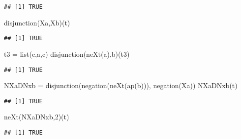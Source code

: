 \documentclass[
]{article}
\newenvironment{Shaded}{\begin{snugshade}}{\end{snugshade}}
\newcommand{\DecValTok}[1]{\textcolor[rgb]{0.00,0.00,0.81}{#1}}
\newcommand{\FunctionTok}[1]{\textcolor[rgb]{0.00,0.00,0.00}{#1}}
\newcommand{\NormalTok}[1]{#1}
\newcommand{\OtherTok}[1]{\textcolor[rgb]{0.56,0.35,0.01}{#1}}
\newcommand{\StringTok}[1]{\textcolor[rgb]{0.31,0.60,0.02}{#1}}
\begin{document}
\begin{verbatim}
## [1] TRUE
\end{verbatim}

\begin{Shaded}
\begin{Highlighting}[]
\FunctionTok{disjunction}\NormalTok{(Xa,Xb)(t) }
\end{Highlighting}
\end{Shaded}

\begin{verbatim}
## [1] TRUE
\end{verbatim}

\begin{Shaded}
\begin{Highlighting}[]
\NormalTok{t3 }\OtherTok{=} \FunctionTok{list}\NormalTok{(}\StringTok{\textquotesingle{}c\textquotesingle{}}\NormalTok{,}\StringTok{\textquotesingle{}a\textquotesingle{}}\NormalTok{,}\StringTok{\textquotesingle{}c\textquotesingle{}}\NormalTok{)}
\FunctionTok{disjunction}\NormalTok{(}\FunctionTok{neXt}\NormalTok{(a),b)(t3)}
\end{Highlighting}
\end{Shaded}

\begin{verbatim}
## [1] TRUE
\end{verbatim}

\begin{Shaded}
\begin{Highlighting}[]
\NormalTok{NXaDNxb }\OtherTok{=} \FunctionTok{disjunction}\NormalTok{(}\FunctionTok{negation}\NormalTok{(}\FunctionTok{neXt}\NormalTok{(}\FunctionTok{ap}\NormalTok{(}\StringTok{\textquotesingle{}b\textquotesingle{}}\NormalTok{))), }\FunctionTok{negation}\NormalTok{(Xa))}
\FunctionTok{NXaDNxb}\NormalTok{(t) }
\end{Highlighting}
\end{Shaded}

\begin{verbatim}
## [1] TRUE
\end{verbatim}

\begin{Shaded}
\begin{Highlighting}[]
\FunctionTok{neXt}\NormalTok{(NXaDNxb,}\DecValTok{2}\NormalTok{)(t)}
\end{Highlighting}
\end{Shaded}

\begin{verbatim}
## [1] TRUE
\end{verbatim}
\end{document}
